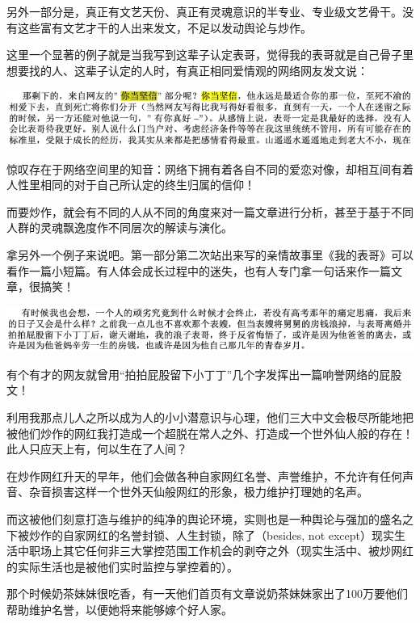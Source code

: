 \documentclass[9pt, b5paper]{article}
\begin{document}
另外一部分是，真正有文艺天份、真正有灵魂意识的半专业、专业级文艺骨干。没有这些富有文艺才干的人出来发文，不足以发动舆论与炒作。 

这里一个显著的例子就是当我写到这辈子认定表哥，觉得我的表哥就是自己骨子里想要找的人、这辈子认定的人时，有真正相同爱情观的网络网友发文说：

\begin{center}
\includegraphics[width=.9\linewidth]{./pic/backups_plans_20210412_165616.png}
\end{center}

惊叹存在于网络空间里的知音：网络下拥有着各自不同的爱恋对像，却相互间有着人性里相同的对于自己所认定的终生归属的信仰！

而要炒作，就会有不同的人从不同的角度来对一篇文章进行分析，甚至于基于不同人群的灵魂飘逸度作不同层次的解读与演化。

拿另外一个例子来说吧。第一部分第二次站出来写的亲情故事里《我的表哥》可以看作一篇小短篇。有人体会成长过程中的迷失，也有人专门拿一句话来作一篇文章，很搞笑！

\begin{center}
\includegraphics[width=.9\linewidth]{./pic/backups_plans_20210412_170341.png}
\end{center}

有个有才的网友就曾用“拍拍屁股留下小丁丁”几个字发挥出一篇响誉网络的屁股文！

利用我那点儿人之所以成为人的小小潜意识与心理，他们三大中文会极尽所能地把被他们炒作的网红我打造成一个超脱在常人之外、打造成一个世外仙人般的存在！此人只应天上有，何以生在了人间？

在炒作网红升天的早年，他们会做各种自家网红名誉、声誉维护，不允许有任何声音、杂音损害这样一个世外天仙般网红的形象，极力维护打理她的名声。

而这被他们刻意打造与维护的纯净的舆论环境，实则也是一种舆论与强加的盛名之下被炒作的自家网红的名誉封锁、人生封锁，除了（besides, not except）现实生活中职场上其它任何非三大掌控范围工作机会的剥夺之外（现实生活中、被炒网红的实际生活也是被他们实时监控与掌控着的）。

那个时候奶茶妹妹很吃香，有一天他们首页有文章说奶茶妹妹家出了100万要他们帮助维护名誉，以便她将来能够嫁个好人家。
\end{document}
